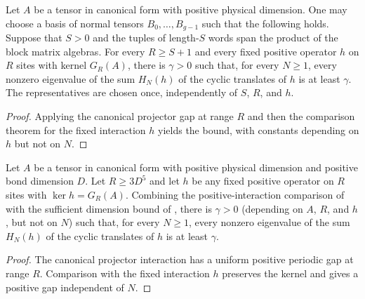 \begin{lemma}
    \label{thm:canonical-positive-parent-gap-simultaneous-injectivity}
    \leanok
    Let $A$ be a tensor in canonical form with positive physical dimension.
    One may choose a basis of normal tensors $B_0,\ldots,B_{g-1}$ such that
    the following holds. Suppose that $S>0$ and the tuples of length-$S$ words
    span the product of the block matrix algebras. For
    every $R\geq S+1$ and every fixed positive operator $h$ on $R$ sites with
    kernel $G_R(A)$, there is $\gamma>0$ such that, for every $N\geq1$,
    every nonzero eigenvalue of the sum $H_N(h)$ of the cyclic translates of
    $h$ is at least $\gamma$.
    The representatives are chosen once, independently of $S$, $R$, and $h$.
\end{lemma}
\begin{proof}
    \leanok
    Applying the canonical projector gap at range $R$ and then the comparison
    theorem for the fixed interaction $h$ yields the bound, with constants
    depending on $h$ but not on $N$.
\end{proof}

\begin{lemma}
    \label{thm:canonical_positive_parent_gap_bounded_range}
    \leanok
    Let $A$ be a tensor in canonical form with positive physical dimension
    and positive bond dimension $D$. Let $R\geq3D^5$ and let $h$ be any
    fixed positive operator on $R$ sites with $\ker h=G_R(A)$. Combining the
    positive-interaction comparison of \cite[Section~IV.C]{Cirac2021Matrix}
    with the sufficient dimension bound of
    \cite[lines~317--345]{Cirac2016MPDO_arXiv}, there is $\gamma>0$
    (depending on $A$, $R$, and $h$, but not on $N$) such that, for every
    $N\geq1$, every nonzero eigenvalue of the sum $H_N(h)$ of the cyclic
    translates of $h$ is at least $\gamma$.
\end{lemma}
\begin{proof}
    \leanok
    The canonical projector interaction has a uniform positive periodic
    gap at range $R$. Comparison with the fixed interaction $h$ preserves
    the kernel and gives a positive gap independent of $N$.
\end{proof}

